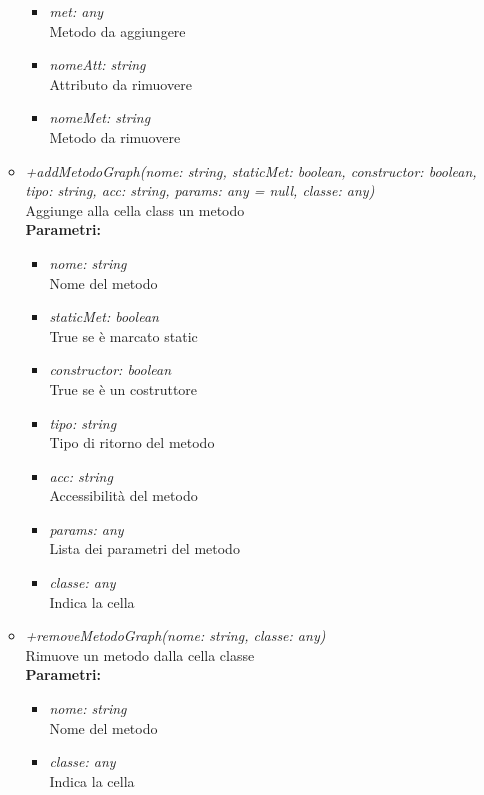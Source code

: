 \begin{itemize}
\begin{itemize}
\begin{itemize}
    			\item \emph{met: any}\\
    			Metodo da aggiungere
    			\item \emph{nomeAtt: string}\\
    			Attributo da rimuovere
    			\item \emph{nomeMet: string}\\
    			Metodo da rimuovere
    		\end{itemize}
    		\item \emph{+addMetodoGraph(nome: string, staticMet: boolean, constructor: boolean,
    tipo: string, acc: string, params: any = null, classe: any)}\\
    		Aggiunge alla cella class un metodo\\
    		\textbf{Parametri:}
    		\begin{itemize}
    			\item \emph{nome: string}\\
    			Nome del metodo
    			\item \emph{staticMet: boolean}\\
    			True se è marcato static
    			\item \emph{constructor: boolean}\\
    			True se è un costruttore
    			\item \emph{tipo: string}\\
    			Tipo di ritorno del metodo
    			\item \emph{acc: string}\\
    			Accessibilità del metodo
    			\item \emph{params: any}\\
    			Lista dei parametri del metodo
    			\item \emph{classe: any}\\
    			Indica la cella
    		\end{itemize}
    		\item \emph{+removeMetodoGraph(nome: string, classe: any)}\\
    		Rimuove un metodo dalla cella classe\\
    		\textbf{Parametri:}
    		\begin{itemize}
    			\item \emph{nome: string}\\
    			Nome del metodo
    			\item \emph{classe: any}\\
    			Indica la cella
    		\end{itemize}

\end{itemize}
\end{itemize}
